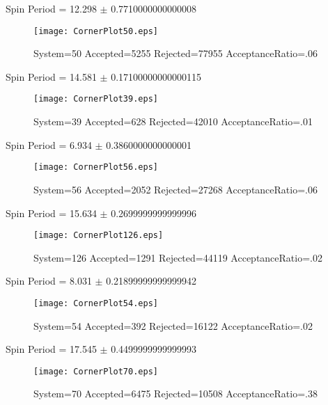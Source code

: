 \documentclass[10pt]{article}
\begin{document}
\newpage
\begin{center}
        Spin Period = 12.298 $\pm$ 0.7710000000000008
        \end{center}
\begin{figure}[H] 
        \texttt{[image: CornerPlot50.eps]}
        \caption{System=50 Accepted=5255 Rejected=77955 AcceptanceRatio=.06}
        \label{S50}
        \centering
        \end{figure}
\newpage
\begin{center}
        Spin Period = 14.581 $\pm$ 0.17100000000000115
        \end{center}
\begin{figure}[H] 
        \texttt{[image: CornerPlot39.eps]}
        \caption{System=39 Accepted=628 Rejected=42010 AcceptanceRatio=.01}
        \label{S39}
        \centering
        \end{figure}
\newpage
\begin{center}
        Spin Period = 6.934 $\pm$ 0.3860000000000001
        \end{center}
\begin{figure}[H] 
        \texttt{[image: CornerPlot56.eps]}
        \caption{System=56 Accepted=2052 Rejected=27268 AcceptanceRatio=.06}
        \label{S56}
        \centering
        \end{figure}
\newpage
\begin{center}
        Spin Period = 15.634 $\pm$ 0.2699999999999996
        \end{center}
\begin{figure}[H] 
        \texttt{[image: CornerPlot126.eps]}
        \caption{System=126 Accepted=1291 Rejected=44119 AcceptanceRatio=.02}
        \label{S126}
        \centering
        \end{figure}
\newpage
\begin{center}
        Spin Period = 8.031 $\pm$ 0.21899999999999942
        \end{center}
\begin{figure}[H] 
        \texttt{[image: CornerPlot54.eps]}
        \caption{System=54 Accepted=392 Rejected=16122 AcceptanceRatio=.02}
        \label{S54}
        \centering
        \end{figure}
\newpage
\begin{center}
        Spin Period = 17.545 $\pm$ 0.4499999999999993
        \end{center}
\begin{figure}[H] 
        \texttt{[image: CornerPlot70.eps]}
        \caption{System=70 Accepted=6475 Rejected=10508 AcceptanceRatio=.38}
        \label{S70}
        \centering
        \end{figure}
\end{document}
